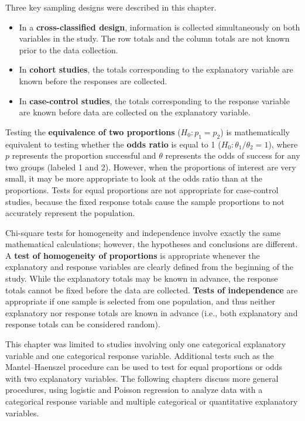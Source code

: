 \documentclass[
]{book}
\providecommand{\tightlist}{%
  \setlength{\itemsep}{0pt}\setlength{\parskip}{0pt}}
\begin{document}
Three key sampling designs were described in this chapter.

\begin{itemize}
\tightlist
\item
  In a \textbf{cross-classified design}, information is collected simultaneously on both variables in the study. The row totals and the column totals are not known prior to the data collection.
\item
  In \textbf{cohort studies}, the totals corresponding to the explanatory variable are known before the responses are collected.
\item
  In \textbf{case-control studies}, the totals corresponding to the response variable are known before data are collected on the explanatory variable.
\end{itemize}

Testing the \textbf{equivalence of two proportions} (\(H_0: p_1 = p_2\)) is mathematically equivalent to testing whether the \textbf{odds ratio} is equal to 1 (\(H_0: \theta_1/\theta_2 = 1\)), where \(p\) represents the proportion successful and \(\theta\) represents the odds of success for any two groups (labeled 1 and 2). However, when the proportions of interest are very small, it may be more appropriate to look at the odds ratio than at the proportions. Tests for equal proportions are not appropriate for case-control studies, because the fixed response totals cause the sample proportions to not accurately represent the population.

Chi-square tests for homogeneity and independence involve exactly the same mathematical calculations; however, the hypotheses and conclusions are different. A \textbf{test of homogeneity of proportions} is appropriate whenever the explanatory and response variables are clearly defined from the beginning of the study. While the explanatory totals may be known in advance, the response totals cannot be fixed before the data are collected. \textbf{Tests of independence} are appropriate if one sample is selected from one population, and thus neither explanatory nor response totals are known in advance (i.e., both explanatory and response totals can be considered random).

This chapter was limited to studies involving only one categorical explanatory variable and one categorical response variable. Additional tests such as the Mantel--Haenszel procedure can be used to test for equal proportions or odds with two explanatory variables. The following chapters discuss more general procedures, using logistic and Poisson regression to analyze data with a categorical response variable and multiple categorical or quantitative explanatory variables.
\end{document}
